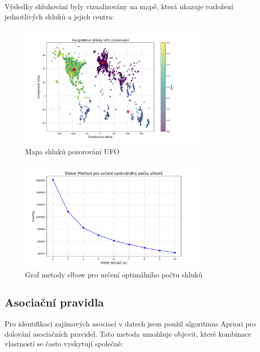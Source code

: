\documentclass[a4paper,12pt]{article}
\begin{document}
Výsledky shlukování byly vizualizovány na mapě, která ukazuje rozložení jednotlivých shluků a jejich centra:

\begin{figure}[h]
\centering
\includegraphics[width=0.8\textwidth]{../images/ufo_clusters_map.png}
\caption{Mapa shluků pozorování UFO}
\end{figure}

\begin{figure}[h]
\centering
\includegraphics[width=0.8\textwidth]{../images/ufo_elbow_method.png}
\caption{Graf metody elbow pro určení optimálního počtu shluků}
\end{figure}

\subsection{Asociační pravidla}
Pro identifikaci zajímavých asociací v datech jsem použil algoritmus Apriori pro dolování asociačních pravidel. Tato metoda umožňuje objevit, které kombinace vlastností se často vyskytují společně:
\end{document}
